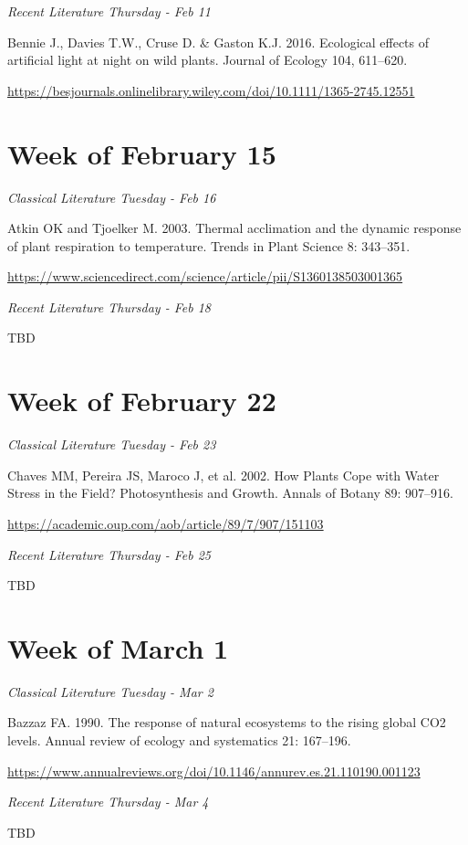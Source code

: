 \documentclass[12pt, notitlepage]{article}   	%
\begin{document}
{\textit{Recent Literature Thursday - Feb 11} \par
Bennie J., Davies T.W., Cruse D. & Gaston K.J. 2016. 
Ecological effects of artificial light at night on wild plants. 
Journal of Ecology 104, 611–620. \par
\url{https://besjournals.onlinelibrary.wiley.com/doi/10.1111/1365-2745.12551}

\section*{Week of February 15}
\textit{Classical Literature Tuesday - Feb 16} \par
Atkin OK and Tjoelker M. 2003. Thermal acclimation and the dynamic response of plant 
respiration to temperature. Trends in Plant Science 8: 343–351. \par
\url{https://www.sciencedirect.com/science/article/pii/S1360138503001365}

\textit{Recent Literature Thursday - Feb 18} \par
TBD \par

\section*{Week of February 22}
\textit{Classical Literature Tuesday - Feb 23} \par
Chaves MM, Pereira JS, Maroco J, et al. 2002. How Plants Cope with Water Stress 
in the Field? Photosynthesis and Growth. Annals of Botany 89: 907–916. \par
\url{https://academic.oup.com/aob/article/89/7/907/151103}

\textit{Recent Literature Thursday - Feb 25} \par
TBD \par

\section*{Week of March 1}
\textit{Classical Literature Tuesday - Mar 2} \par
Bazzaz FA. 1990. The response of natural ecosystems to the rising global CO2 levels. 
Annual review of ecology and systematics 21: 167–196. \par
\url{https://www.annualreviews.org/doi/10.1146/annurev.es.21.110190.001123}

\textit{Recent Literature Thursday - Mar 4} \par
TBD \par

}
\end{document}
